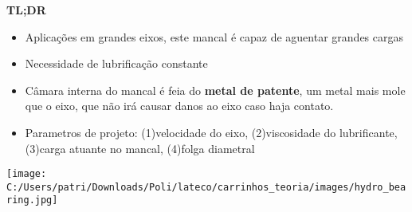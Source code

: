 \textbf{TL;DR}

\begin{itemize}
	\item Aplicações em grandes eixos, este mancal é capaz de aguentar grandes cargas
	\item Necessidade de lubrificação constante
	\item Câmara interna do mancal é feia do \textbf{metal de patente}, um metal mais mole que o eixo, que não irá causar danos ao eixo caso haja contato.
	\item Parametros de projeto: (1)velocidade do eixo, (2)viscosidade do lubrificante, (3)carga atuante no mancal, (4)folga diametral
\end{itemize}

\begin{center}
\texttt{[image: C:/Users/patri/Downloads/Poli/lateco/carrinhos\_teoria/images/hydro\_bearing.jpg]}\\
\end{center}

